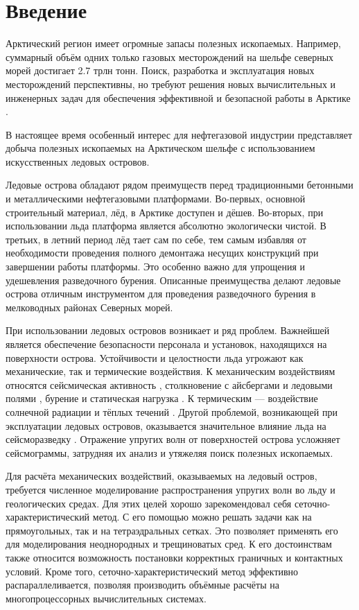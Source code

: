 \section{Введение}

Арктический регион имеет огромные запасы полезных ископаемых. Например, суммарный объём одних только газовых месторождений на шельфе северных морей достигает 2.7 трлн тонн. Поиск, разработка и эксплуатация новых месторождений перспективны, но требуют решения новых вычислительных и инженерных задач для обеспечения эффективной и безопасной работы в Арктике \cite{petrov_arctic}.

В настоящее время особенный интерес для нефтегазовой индустрии представляет добыча полезных ископаемых на Арктическом шельфе с использованием искусственных ледовых островов. 

Ледовые острова обладают рядом преимуществ перед традиционными бетонными и металлическими нефтегазовыми платформами. Во-первых, основной строительный материал, лёд, в Арктике доступен и дёшев. Во-вторых, при использовании льда платформа является абсолютно экологически чистой. В третьих, в летний период лёд тает сам по себе, тем самым избавляя от необходимости проведения полного демонтажа несущих конструкций при завершении работы платформы. Это особенно важно для упрощения и удешевления разведочного бурения. Описанные преимущества делают ледовые острова отличным инструментом для проведения разведочного бурения в мелководных районах Северных морей.

При использовании ледовых островов возникает и ряд проблем. Важнейшей является обеспечение безопасности персонала и установок, находящихся на  поверхности острова. Устойчивости и целостности льда угрожают как механические, так и термические воздействия. К механическим воздействиям относятся сейсмическая активность \cite{ice_during_earthquake}, столкновение с айсбергами и ледовыми полями \cite{iceberg_crash, iceberg_crash2}, бурение и статическая нагрузка \cite{epifanov_crash}. К термическим --- воздействие солнечной радиации и тёплых течений  \cite{canadian_arctic, petrov_arctic}. Другой проблемой, возникающей при эксплуатации ледовых островов, оказывается значительное влияние льда на сейсморазведку \cite{stogniy_ice_influence}. Отражение упругих волн от поверхностей острова усложняет сейсмограммы, затрудняя их анализ и утяжеляя поиск полезных ископаемых.

Для расчёта механических воздействий, оказываемых на ледовый остров, требуется численное моделирование распространения упругих волн во льду и геологических средах. Для этих целей хорошо зарекомендовал себя  сеточно-характеристический метод. С его помощью можно решать задачи как на прямоугольных, так и на тетраэдральных сетках. Это позволяет применять его для моделирования неоднородных и трещиноватых сред. К его достоинствам также относится возможность постановки корректных граничных и контактных условий. Кроме того, сеточно-характеристический метод эффективно распараллеливается, позволяя производить объёмные расчёты на многопроцессорных вычислительных системах.  \cite{petrov_arctic, zhdanov_gcm, biryukov_fractured_layers, favorskaya_thesis, grigoriev}

